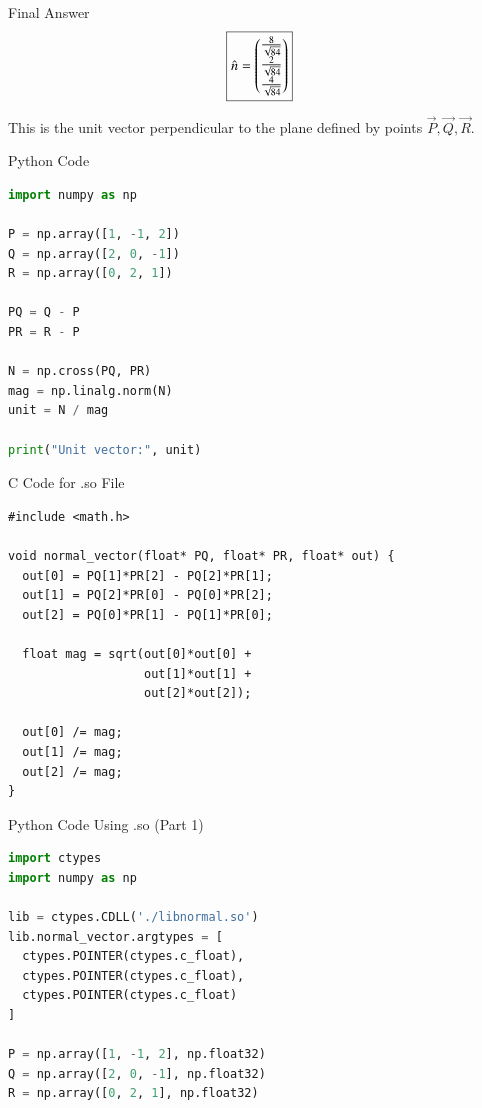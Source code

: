\documentclass{beamer}
\begin{document}
\begin{frame}{Final Answer}
\[
\boxed{
\hat{n} = \begin{pmatrix}\frac{8}{\sqrt{84}} \\ \frac{2}{\sqrt{84}} \\ \frac{4}{\sqrt{84}}\end{pmatrix}
}
\]

This is the unit vector perpendicular to the plane defined by points \( \vec{P}, \vec{Q}, \vec{R} \).
\end{frame}

\begin{frame}[fragile]{Python Code}
\begin{lstlisting}[language=Python]
import numpy as np

P = np.array([1, -1, 2])
Q = np.array([2, 0, -1])
R = np.array([0, 2, 1])

PQ = Q - P
PR = R - P

N = np.cross(PQ, PR)
mag = np.linalg.norm(N)
unit = N / mag

print("Unit vector:", unit)
\end{lstlisting}
\end{frame}



\begin{frame}[fragile]{C Code for .so File}
\begin{lstlisting}
#include <math.h>

void normal_vector(float* PQ, float* PR, float* out) {
  out[0] = PQ[1]*PR[2] - PQ[2]*PR[1];
  out[1] = PQ[2]*PR[0] - PQ[0]*PR[2];
  out[2] = PQ[0]*PR[1] - PQ[1]*PR[0];

  float mag = sqrt(out[0]*out[0] +
                   out[1]*out[1] +
                   out[2]*out[2]);

  out[0] /= mag;
  out[1] /= mag;
  out[2] /= mag;
}
\end{lstlisting}
\end{frame}






\begin{frame}[fragile]{Python Code Using .so (Part 1)}
\begin{lstlisting}[language=Python]
import ctypes
import numpy as np

lib = ctypes.CDLL('./libnormal.so')
lib.normal_vector.argtypes = [
  ctypes.POINTER(ctypes.c_float),
  ctypes.POINTER(ctypes.c_float),
  ctypes.POINTER(ctypes.c_float)
]

P = np.array([1, -1, 2], np.float32)
Q = np.array([2, 0, -1], np.float32)
R = np.array([0, 2, 1], np.float32)
\end{lstlisting}
\end{frame}
\end{document}
